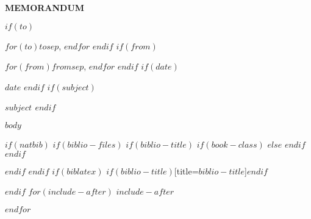\documentclass[$if(fontsize)$$fontsize$,$endif$$if(lang)$$lang$,$endif$$if(papersize)$$papersize$,$endif$$for(classoption)$$classoption$$sep$,$endfor$]{$documentclass$}
\newcommand{\doublerule}[1][.4pt]{%
  \noindent
  \makebox[0pt][l]{\rule[.7ex]{\linewidth}{#1}}%
  \rule[.3ex]{\linewidth}{#1}
}
\begin{document}
\vspace{-40pt}
\vspace{-80pt}
\begin{center}
\textbf{\LARGE{MEMORANDUM}}
\end{center}
\begin{description}[leftmargin=!,itemsep=3pt,labelwidth=\widthof{\textbf{Subject:}  }]
  $if(to)$
    \item[To:] $for(to)$$to$$sep$, $endfor$
  $endif$
  $if(from)$
    \item[From:] $for(from)$$from$$sep$, $endfor$
  $endif$
  $if(date)$
    \item[Date:] $date$
  $endif$
  $if(subject)$
    \item[Subject:] \bfseries{$subject$}
  $endif$
\end{description}
\vspace{-10pt}
\noindent\makebox[\linewidth]{\doublerule}
\vspace{-25pt}


$body$

%
%
% 

$if(natbib)$
$if(biblio-files)$
$if(biblio-title)$
$if(book-class)$
\renewcommand\bibname{$biblio-title$}
$else$
\renewcommand\refname{$biblio-title$}
$endif$
$endif$


$endif$
$endif$
$if(biblatex)$
\printbibliography$if(biblio-title)$[title=$biblio-title$]$endif$

$endif$
$for(include-after)$
$include-after$

$endfor$
\end{document}
